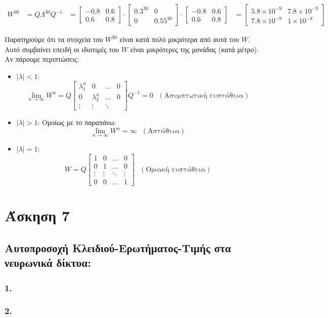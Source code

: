 \documentclass[12pt,a4paper]{article}
\begin{document}
				\begin{align*}
					W^{30} 
					&= Q \varLambda^{30} Q^{-1} 
					&= 
						\begin{bmatrix}
							-0.8 & 0.6 \\
							0.6 & 0.8
						\end{bmatrix} \cdot 
						\begin{bmatrix}
							0.3^{30} & 0 \\
							0 & 0.55^{30}
						\end{bmatrix} \cdot 
						\begin{bmatrix}
							-0.8 & 0.6 \\
							0.6 & 0.8 
						\end{bmatrix}
					&= 
						\begin{bmatrix}
							5.8 \times 10^{-9} & 7.8 \times 10^{-9} \\
							7.8 \times 10^{-9} & 1 \times 10^{-8}
						\end{bmatrix}
				\end{align*}
				
				Παρατηρούμε ότι τα στοιχεία του $W^{30}$ είναι κατά πολύ μικρότερα από αυτά του $W$. Αυτό συμβαίνει επειδή οι ιδιοτιμές του $W$ είναι μικρότερες της μονάδας (κατά μέτρο). Αν πάρουμε περιπτώσεις:
				
				\begin{itemize}
					\item $ |\lambda| < 1 $:
						\[\lim_{n \to \infty} W^n = Q
							\begin{bmatrix}
								\lambda_1^n & 0 & \ldots & 0 \\
								0 & \lambda_2^n & \ldots & 0 \\
								\vdots & \vdots & \ddots &
							\end{bmatrix} Q^{-1} = 0 ~~~(\text{Ασυμπτωτική ευστάθεια})
						\]
					\item $ |\lambda| > 1 $:
						Ομοίως με το παραπάνω:
							\[
								\lim_{n \to \infty} W^n = \infty ~~~(\text{Αστάθεια})
							\]
					\item $ |\lambda| = 1 $:
						\[
							W = Q 
								\begin{bmatrix}
									1 & 0 & \ldots & 0 \\
									0 & 1 & \ldots & 0 \\
									\vdots & \vdots & \ddots & \vdots \\
									0 & 0 & \ldots & 1
								\end{bmatrix} ~~~(\text{Οριακή ευστάθεια})
						\]
				\end{itemize}
		
	\section*{Άσκηση 7}
		
		\subsection*{Αυτοπροσοχή Κλειδιού-Ερωτήματος-Τιμής στα νευρωνικά δίκτυα:}
		
			\subsubsection*{1.}
		
			\subsubsection*{2.}
\end{document}
